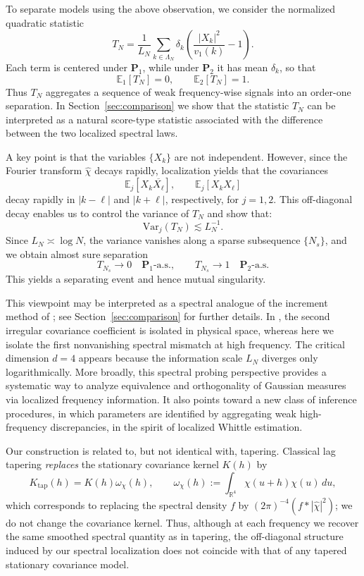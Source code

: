 \documentclass[11pt, reqno]{amsart}
\theoremstyle{remark}
\newcommand{\E}{\mathbb{E}}
\newcommand{\1}{\mathbf{1}}
\begin{document}
To separate models using the above observation, we consider the normalized quadratic statistic
\begin{equation}\label{eqn:quadstat}
T_N
=
\frac{1}{L_N}
\sum_{k\in\Lambda_N}
\delta_k
\left(
\frac{|X_k|^2}{v_1(k)}-1
\right).
\end{equation}
Each term is centered under $\mathbf P_1$, while under $\mathbf P_2$ it has mean $\delta_k$, so that
\[
\E_1[T_N]=0,
\qquad
\E_2[T_N]=1.
\]
Thus $T_N$ aggregates a sequence of weak frequency-wise signals into an
order-one separation. In Section~\ref{sec:comparison} we show that the statistic $T_N$ can be interpreted as a natural score-type statistic associated with the difference between the two localized spectral laws. 

A key point is that the variables $\{X_k\}$ are not independent. However, since the Fourier transform $\widehat{\chi}$ decays rapidly, localization yields that the covariances
\[
\mathbb{E}_j[X_k\overline{X_\ell}],
\qquad
\mathbb{E}_j[X_k X_\ell]
\]
decay rapidly in $|k-\ell|$ and $|k+\ell|$, respectively, for $j=1,2$. This off-diagonal decay enables us to control the variance of $T_N$ and show that: 
\[
\mathrm{Var}_j(T_N)\lesssim L_N^{-1}.
\]
Since $L_N\asymp\log N$, the variance vanishes along a sparse subsequence $\{N_s\}$,
and we obtain almost sure separation
\[
T_{N_s}\to0\quad \mathbf P_1\text{-a.s.},\qquad
T_{N_s}\to1\quad \mathbf P_2\text{-a.s.}
\]
This yields a separating event and hence mutual singularity. 

This viewpoint may be interpreted as a spectral analogue of the increment
method of \citet{Anderes2010}; see Section~\ref{sec:comparison} for further
details. In \citet{Anderes2010}, the second irregular covariance coefficient
is isolated in physical space, whereas here we isolate the first nonvanishing
spectral mismatch at high frequency. The critical dimension $d=4$ appears
because the information scale $L_N$ diverges only logarithmically.
More broadly, this spectral probing perspective provides a systematic way to analyze equivalence and orthogonality of 
Gaussian measures via localized frequency information. It also points toward a new class of inference procedures, in which parameters are identified by aggregating weak high-frequency discrepancies, in the spirit of localized Whittle estimation.

Our construction is related to, but not identical with, tapering. Classical lag tapering \cite{zhang2008covariance} \emph{replaces} the stationary covariance kernel \(K(h)\) by
\[
K_{\mathrm{tap}}(h)=K(h){\omega}_\chi(h), \qquad {\omega}_\chi(h):=\int_{\mathbb R^4}\chi(u+h)\chi(u)\,du,
\]
which corresponds to replacing the spectral density \(f\) by \((2\pi)^{-4}(f*|\widehat{\chi}|^2)\); we do not change the covariance kernel. 
Thus, although at each frequency we recover the same smoothed spectral quantity as in tapering, the off-diagonal structure induced by our spectral localization does not coincide with that of any tapered stationary covariance model.
\end{document}

